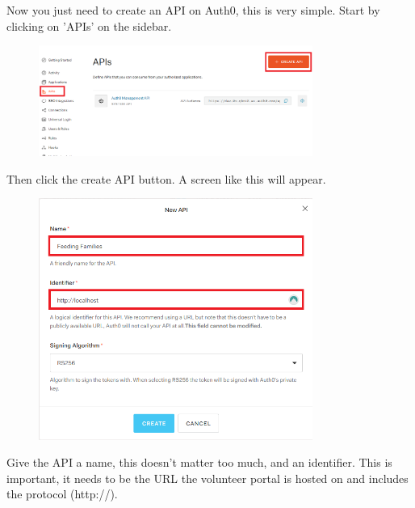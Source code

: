 \documentclass[12pt]{article}
\begin{document}
\noindent
Now you just need to create an API on Auth0, this is very simple. Start by clicking on 'APIs' on the sidebar.
\begin{figure}[H]
    \centering
    \includegraphics[width=0.8\textwidth]{auth0/Apis.png}
\end{figure}
\noindent
Then click the create API button. A screen like this will appear.
\begin{figure}[H]
    \centering
    \includegraphics[width=0.8\textwidth]{auth0/newAPI.png}
\end{figure}
Give the API a name, this doesn't matter too much, and an identifier. This is important, it needs to be the URL the volunteer portal is hosted on and includes the protocol (http://).
\end{document}
